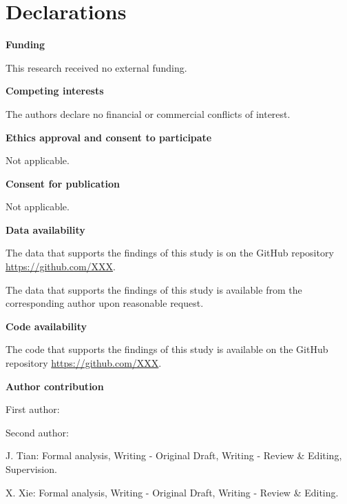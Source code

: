 \documentclass[lineno,pdflatex,sn-mathphys-num]{sn-jnl}%
\theoremstyle{thmstyleone}%
\theoremstyle{thmstyletwo}%
\theoremstyle{thmstylethree}%
\begin{document}
\section*{Declarations}

\textbf{Funding}

This research received no external funding. \newline

\noindent\textbf{Competing interests}

The authors declare no financial or commercial conflicts of interest. \newline

\noindent\textbf{Ethics approval and consent to participate}

Not applicable.\newline

\noindent\textbf{Consent for publication}

Not applicable.\newline

\noindent\textbf{Data availability }

The data that supports the findings of this study is on the GitHub repository \url{https://github.com/XXX}.\newline

The data that supports the findings of this study is available from the corresponding author upon reasonable request. \newline

\noindent\textbf{Code availability }

The code that supports the findings of this study is available on the GitHub repository \url{https://github.com/XXX}.\newline

\noindent\textbf{Author contribution}


First author: 

Second author:


J. Tian: Formal analysis, Writing - Original Draft, Writing - Review \& Editing, Supervision.

X. Xie: Formal analysis, Writing - Original Draft, Writing - Review \& Editing.

\end{document}
